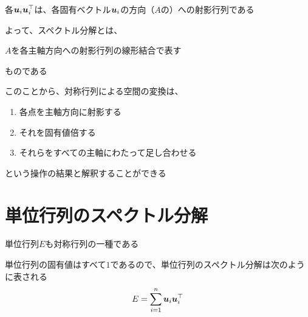 \documentclass[../../../topic_linear-algebra]{subfiles}
\begin{document}
\br

各$\vb*{u}_i\vb*{u}_i^\top$は、各固有ベクトル$\vb*{u}_i$の方向（$A$の）への射影行列である

よって、スペクトル分解とは、
\begin{shaded}
  $A$を各主軸方向への射影行列の線形結合で表す
\end{shaded}
ものである

\br

このことから、対称行列による空間の変換は、
\begin{enumerate}
  \item 各点を主軸方向に射影する
  \item それを固有値倍する
  \item それらをすべての主軸にわたって足し合わせる
\end{enumerate}
という操作の結果と解釈することができる

\sectionline
\section{単位行列のスペクトル分解}

単位行列$E$も対称行列の一種である

\br

単位行列の固有値はすべて$1$であるので、単位行列のスペクトル分解は次のように表される
\begin{equation*}
  E = \sum_{i=1}^n \vb*{u}_i \vb*{u}_i^\top
\end{equation*}
\end{document}
